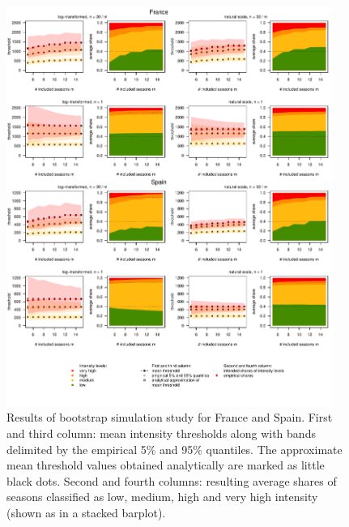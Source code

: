\documentclass{article}
\begin{document}
\begin{figure}
\centering
\includegraphics[page=1, width=0.95\textwidth]{figure/plot_results.pdf}
\caption{Results of bootstrap simulation study for France and Spain. First and third column: mean intensity thresholds along with bands delimited by the empirical 5\% and 95\% quantiles. The approximate mean threshold values obtained analytically are marked as little black dots. Second and fourth columns: resulting average shares of seasons classified as low, medium, high and very high intensity (shown as in a stacked barplot).}
\label{fig:results1}
\end{figure}
\end{document}
